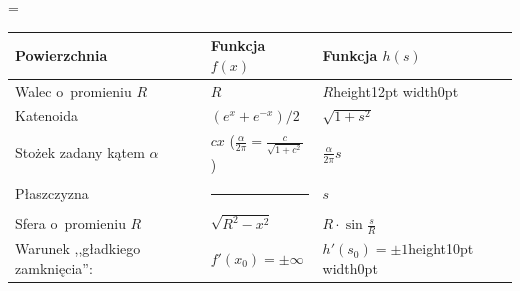 \begin{center}\everymath={\displaystyle }
\begin{tabular}{lll}%
Powierzchnia & Funkcja $f(x)$ & Funkcja $h(s)$ \\[1pt]
\hline
Walec o~promieniu $R$ & $R$ & $R$\vrule height12pt width0pt \\
Katenoida & $(e^x+e^{-x})/2$ & $\sqrt{1+s^2}$ \\
Stożek zadany kątem $\alpha$ & $cx$ ($\tfrac{\alpha}{2\pi} = \tfrac{c}{\sqrt{1+c^2}}$) & $\frac{\alpha}{2\pi} s$ \\
Płaszczyzna & \rule[0.4em]{2cm}{0.4pt} & $s$ \\
Sfera o~promieniu $R$ & $\sqrt{R^2-x^2}$ & $R \cdot \sin \frac{s}{R}$ \\[5pt]
\hline
Warunek ,,gładkiego zamknięcia'': & $f'(x_0) = \pm \infty$ & $h'(s_0) = \pm 1$\vrule height10pt width0pt
\end{tabular}
\end{center}

